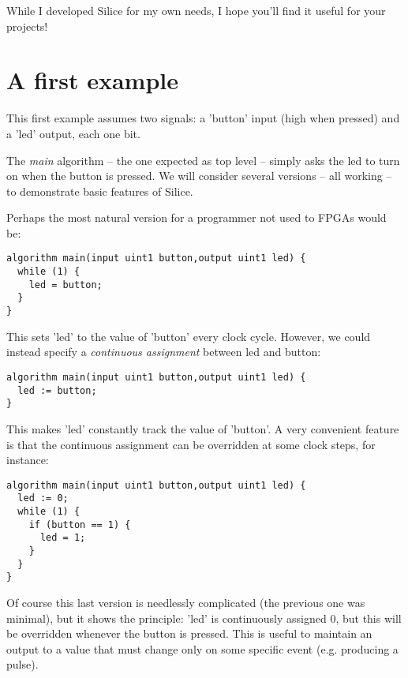 \documentclass[a4]{article}
\newcommand\silice{Silice}
\begin{document}
\noindent While I developed \silice{} for my own needs, I hope you'll find it useful for your projects!

	
\section{A first example}

This first example assumes two signals: a 'button' input (high when pressed) and a 'led' output, each one bit.

The \textit{main} algorithm -- the one expected as top level -- simply asks the led to turn on when the button is pressed. We will consider several versions -- all working -- to demonstrate basic features of \silice{}.

Perhaps the most natural version for a programmer not used to FPGAs would be:

\begin{verbatim}
algorithm main(input uint1 button,output uint1 led) {  
  while (1) {
    led = button;
  }
}
\end{verbatim}
This sets 'led' to the value of 'button' every clock cycle.
%
However, we could instead specify a \textit{continuous assignment} between led and button:

\begin{verbatim}
algorithm main(input uint1 button,output uint1 led) {  
  led := button;
}
\end{verbatim}

This makes 'led' constantly track the value of 'button'. A very convenient feature is that the continuous assignment can be overridden at some clock steps, for instance:

\begin{verbatim}
algorithm main(input uint1 button,output uint1 led) {  
  led := 0;
  while (1) {
    if (button == 1) {
      led = 1;
    }
  }  
}
\end{verbatim}

Of course this last version is needlessly complicated (the previous one was minimal), but it shows the principle: 'led' is continuously assigned 0, but this will be overridden whenever the button is pressed. This is useful to maintain an output to a value that must change only on some specific event (e.g. producing a pulse).

\end{document}
